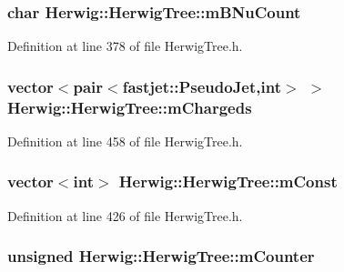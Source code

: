 \subsubsection[{\texorpdfstring{m\+B\+Nu\+Count}{mBNuCount}}]{\setlength{\rightskip}{0pt plus 5cm}char Herwig\+::\+Herwig\+Tree\+::m\+B\+Nu\+Count\hspace{0.3cm}{\ttfamily [protected]}}\hypertarget{class_herwig_1_1_herwig_tree_a3a3a0ddaf489eb0e4a049eaf7cd084b2}{}\label{class_herwig_1_1_herwig_tree_a3a3a0ddaf489eb0e4a049eaf7cd084b2}


Definition at line 378 of file Herwig\+Tree.\+h.

\subsubsection[{\texorpdfstring{m\+Chargeds}{mChargeds}}]{\setlength{\rightskip}{0pt plus 5cm}vector$<$pair$<$fastjet\+::\+Pseudo\+Jet,int$>$ $>$ Herwig\+::\+Herwig\+Tree\+::m\+Chargeds\hspace{0.3cm}{\ttfamily [protected]}}\hypertarget{class_herwig_1_1_herwig_tree_a9c61c42232484ac6b345ef8720131a5c}{}\label{class_herwig_1_1_herwig_tree_a9c61c42232484ac6b345ef8720131a5c}


Definition at line 458 of file Herwig\+Tree.\+h.

\subsubsection[{\texorpdfstring{m\+Const}{mConst}}]{\setlength{\rightskip}{0pt plus 5cm}vector$<$int$>$ Herwig\+::\+Herwig\+Tree\+::m\+Const\hspace{0.3cm}{\ttfamily [protected]}}\hypertarget{class_herwig_1_1_herwig_tree_a98e0a308cd96f540d32c4f4f21744a97}{}\label{class_herwig_1_1_herwig_tree_a98e0a308cd96f540d32c4f4f21744a97}


Definition at line 426 of file Herwig\+Tree.\+h.

\subsubsection[{\texorpdfstring{m\+Counter}{mCounter}}]{\setlength{\rightskip}{0pt plus 5cm}unsigned Herwig\+::\+Herwig\+Tree\+::m\+Counter\hspace{0.3cm}{\ttfamily [protected]}}\hypertarget{class_herwig_1_1_herwig_tree_aff68962320b3b854debe9db4d52d076a}{}\label{class_herwig_1_1_herwig_tree_aff68962320b3b854debe9db4d52d076a}


